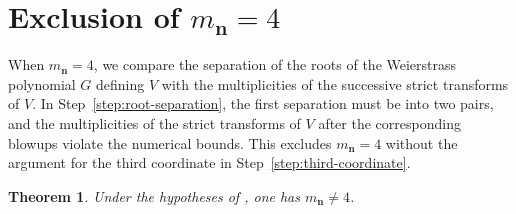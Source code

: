 \documentclass[11pt,letterpaper]{article}
\numberwithin{equation}{section}
\newtheorem{theorem}[theorem]{Theorem}
\theoremstyle{remark}
\theoremstyle{plain}
\begin{document}
\section{Exclusion of
\texorpdfstring{$m_{\boldsymbol{n}}=4$}{m(n)=4}}
\label{sec:dfour}

When $m_{\boldsymbol n}=4$, we compare the separation of the roots of the
Weierstrass polynomial $G$ defining $V$ with the multiplicities of the
successive strict transforms of $V$.
In Step~\ref{step:root-separation}, the first separation must be into
two pairs, and the multiplicities of the strict transforms of $V$
after the corresponding blowups violate the numerical bounds.  This excludes $m_{\boldsymbol n}=4$ without the
argument for the third coordinate in Step~\ref{step:third-coordinate}.

\begin{theorem}
\label{thm:dfour}
Under the hypotheses of , one has
$m_{\boldsymbol{n}}\neq4$.
\end{theorem}
\end{document}
